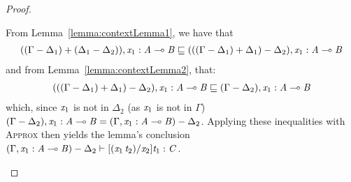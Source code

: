 \begin{proof}
\begin{enumerate}[itemsep=1em]
    From Lemma~\ref{lemma:contextLemma1}, we have that
    \begin{align*}
      (  (  \Gamma  -  \Delta_{{\mathrm{1}}}  )  +  (  \Delta_{{\mathrm{1}}}  -  \Delta_{{\mathrm{2}}}  )  )  ,   \mathit{x_{{\mathrm{1}}}}  :   \mathit{A}  \multimap  \mathit{B} \sqsubseteq (  (  (  \Gamma  -  \Delta_{{\mathrm{1}}}  )  +  \Delta_{{\mathrm{1}}}  )  -  \Delta_{{\mathrm{2}}}  )  ,   \mathit{x_{{\mathrm{1}}}}  :   \mathit{A}  \multimap  \mathit{B}
    \end{align*}
    and from Lemma~\ref{lemma:contextLemma2}, that:
    \begin{align*}
      (  (  (  \Gamma  -  \Delta_{{\mathrm{1}}}  )  +  \Delta_{{\mathrm{1}}}  )  -  \Delta_{{\mathrm{2}}}  )  ,   \mathit{x_{{\mathrm{1}}}}  :   \mathit{A}  \multimap  \mathit{B} \sqsubseteq (  \Gamma  -  \Delta_{{\mathrm{2}}}  )  ,   \mathit{x_{{\mathrm{1}}}}  :   \mathit{A}  \multimap  \mathit{B}
    \end{align*}
    which, since $\mathit{x_{{\mathrm{1}}}}$ is not in $\Delta_{{\mathrm{2}}}$ (as $\mathit{x_{{\mathrm{1}}}}$ is not
    in $\Gamma$)
    $(  \Gamma  -  \Delta_{{\mathrm{2}}}  )  ,   \mathit{x_{{\mathrm{1}}}}  :   \mathit{A}  \multimap  \mathit{B} = (  \Gamma  ,   \mathit{x_{{\mathrm{1}}}}  :   \mathit{A}  \multimap  \mathit{B}    )  -  \Delta_{{\mathrm{2}}}$. Applying
    these inequalities with \textsc{Approx} then yields the lemma's
    conclusion $(  \Gamma  ,   \mathit{x_{{\mathrm{1}}}}  :   \mathit{A}  \multimap  \mathit{B}    )  -  \Delta_{{\mathrm{2}}}   \vdash   [  (  \mathit{x_{{\mathrm{1}}}} \, \mathit{t_{{\mathrm{2}}}}  )  /  \mathit{x_{{\mathrm{2}}}}  ]  \mathit{t_{{\mathrm{1}}}}   :  \mathit{C}$.


\end{enumerate}
\end{proof}
